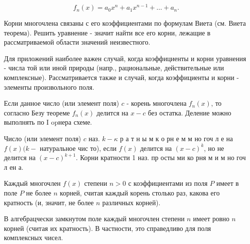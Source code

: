 \documentclass[10pt]{article}
\begin{document}
\[

f_{n}(x)=a_{0} x^{n}+a_{1} x^{n-1}+\ldots+a_{n} .

\]



Корни многочлена связаны с его коэффициентами по формулам Виета (см. Виета теорема). Решить уравнение - значит найти все его корни, лежащие в рассматриваемой области значений неизвестного.



Для приложений наиболее важен случай, когда коэффициенты и корни уравнения - числа той или иной природы (напр., рациональные, действительные или комплексные). Рассматривается также и случай, когда коэффициенты и корни - элементы произвольного поля.



Если данное число (или элемент поля) $c$ - корень многочлена $f_{n}(x)$, то согласно Безу теореме $f_{n}(x)$ делится на $x-c$ без остатка. Деление можно выполнять по I opнера схеме.



Число (или элемент поля) $c$ наз. $k-\kappa$ р а т н ы м к о рн е м м но гоч л е на $f(x)(k-$ натуральное чис то), если $f(x)$ делится на $(x-c)^{k}$, но не делится на $(x-c)^{k+1}$. Корни кратности 1 наз. пр осты ми ко рня м и м но гоч л ен а.



Каждый многочлен $f(x)$ степени $n>0$ с коэффициентами из поля $P$ имеет в поле $P$ не более $n$ корней, считая каждый корень столько раз, какова его кратность (и, значит, не более $n$ различных корней).



В алгебрацчески замкнутом поле каждый многочлен степени $n$ имеет ровно $n$ корней (считая их кратность). В частности, это справедливо для поля комплексных чисел.
\end{document}
